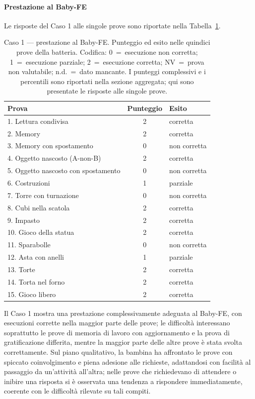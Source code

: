  \paragraph*{Prestazione al Baby-FE}

Le risposte del Caso 1 alle singole prove sono riportate nella Tabella~\ref{tab:caso1_prove}.

\begin{table}[htbp]
\centering
\caption[Caso 1 --- prestazione al Baby-FE]{Caso 1 --- prestazione al Baby-FE. Punteggio ed esito nelle quindici prove della batteria. Codifica: 0~=~esecuzione non corretta; 1~=~esecuzione parziale; 2~=~esecuzione corretta; NV~=~prova non valutabile; n.d.~=~dato mancante. I punteggi complessivi e i percentili sono riportati nella sezione aggregata; qui sono presentate le risposte alle singole prove.}
\label{tab:caso1_prove}
\begin{tabular}{|l|c|l|}
\toprule
\textbf{Prova} & \textbf{Punteggio} & \textbf{Esito} \\
\midrule
1. Lettura condivisa & 2 & corretta \\
2. Memory & 2 & corretta \\
3. Memory con spostamento & 0 & non corretta \\
4. Oggetto nascosto (A-non-B) & 2 & corretta \\
5. Oggetto nascosto con spostamento & 0 & non corretta \\
6. Costruzioni & 1 & parziale \\
7. Torre con turnazione & 0 & non corretta \\
8. Cubi nella scatola & 2 & corretta \\
9. Impasto & 2 & corretta \\
10. Gioco della statua & 2 & corretta \\
11. Sparabolle & 0 & non corretta \\
12. Asta con anelli & 1 & parziale \\
13. Torte & 2 & corretta \\
14. Torta nel forno & 2 & corretta \\
15. Gioco libero & 2 & corretta \\
\bottomrule
\end{tabular}
\end{table}

Il Caso 1 mostra una prestazione complessivamente adeguata al Baby-FE, con esecuzioni corrette nella maggior parte delle prove; le difficoltà interessano soprattutto le prove di memoria di lavoro con aggiornamento e la prova di gratificazione differita, mentre la maggior parte delle altre prove è stata svolta correttamente. Sul piano qualitativo, la bambina ha affrontato le prove con spiccato coinvolgimento e piena adesione alle richieste, adattandosi con facilità al passaggio da un'attività all'altra; nelle prove che richiedevano di attendere o inibire una risposta si è osservata una tendenza a rispondere immediatamente, coerente con le difficoltà rilevate su tali compiti.

